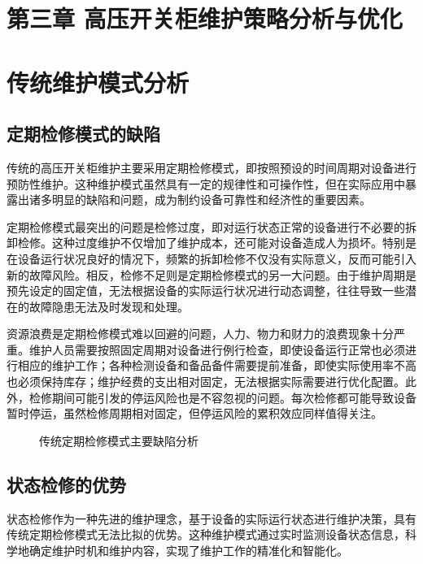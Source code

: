 \section{第三章 高压开关柜维护策略分析与优化}

\section{传统维护模式分析}

\subsection{定期检修模式的缺陷}

传统的高压开关柜维护主要采用定期检修模式，即按照预设的时间周期对设备进行预防性维护。这种维护模式虽然具有一定的规律性和可操作性，但在实际应用中暴露出诸多明显的缺陷和问题，成为制约设备可靠性和经济性的重要因素。

定期检修模式最突出的问题是检修过度，即对运行状态正常的设备进行不必要的拆卸检修。这种过度维护不仅增加了维护成本，还可能对设备造成人为损坏。特别是在设备运行状况良好的情况下，频繁的拆卸检修不仅没有实际意义，反而可能引入新的故障风险。相反，检修不足则是定期检修模式的另一大问题。由于维护周期是预先设定的固定值，无法根据设备的实际运行状况进行动态调整，往往导致一些潜在的故障隐患无法及时发现和处理。

资源浪费是定期检修模式难以回避的问题，人力、物力和财力的浪费现象十分严重。维护人员需要按照固定周期对设备进行例行检查，即使设备运行正常也必须进行相应的维护工作；各种检测设备和备品备件需要提前准备，即使实际使用率不高也必须保持库存；维护经费的支出相对固定，无法根据实际需要进行优化配置。此外，检修期间可能引发的停运风险也是不容忽视的问题。每次检修都可能导致设备暂时停运，虽然检修周期相对固定，但停运风险的累积效应同样值得关注。

\begin{figure}[h]
\centering
\caption{传统定期检修模式主要缺陷分析}
\label{fig:traditional_maintenance_problems}
\end{figure}

\subsection{状态检修的优势}

状态检修作为一种先进的维护理念，基于设备的实际运行状态进行维护决策，具有传统定期检修模式无法比拟的优势。这种维护模式通过实时监测设备状态信息，科学地确定维护时机和维护内容，实现了维护工作的精准化和智能化。

